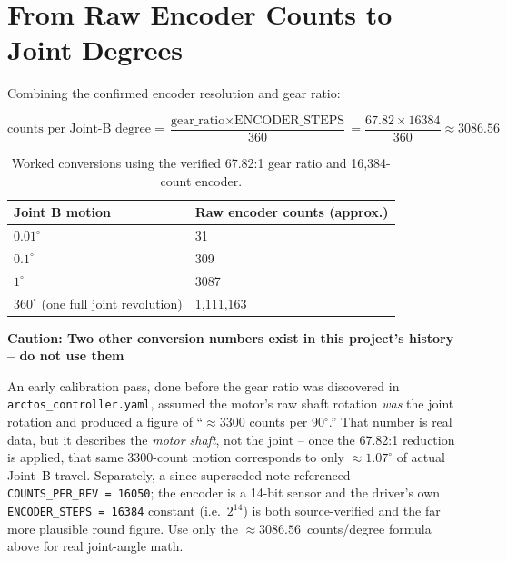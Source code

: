 \documentclass[11pt,letterpaper]{article}
\newenvironment{caution}[1]{%
    \par\addvspace{8pt}%
    \noindent{\color{cautionred}\rule{\linewidth}{0.8pt}}\par\vspace{2pt}
    \noindent\textbf{\color{cautionred}Caution: #1}\par\vspace{2pt}
}{%
    \par\vspace{2pt}\noindent{\color{cautionred}\rule{\linewidth}{0.4pt}}%
    \par\addvspace{8pt}%
}
\begin{document}
\newpage
\section{From Raw Encoder Counts to Joint Degrees}

Combining the confirmed encoder resolution and gear ratio:

\[
\text{counts per Joint-B degree} = \frac{\text{gear\_ratio} \times \text{ENCODER\_STEPS}}{360} = \frac{67.82 \times 16384}{360} \approx 3086.56
\]

\begin{table}[h]
\centering
\begin{tabular}{ll}
\toprule
\textbf{Joint B motion} & \textbf{Raw encoder counts (approx.)} \\ \midrule
$0.01^\circ$ & 31 \\
$0.1^\circ$ & 309 \\
$1^\circ$ & 3087 \\
$360^\circ$ (one full joint revolution) & 1{,}111{,}163 \\ \bottomrule
\end{tabular}
\caption{Worked conversions using the verified 67.82:1 gear ratio and 16{,}384-count encoder.}
\end{table}

\begin{caution}{Two other conversion numbers exist in this project's history -- do not use them}
An early calibration pass, done before the gear ratio was discovered in \texttt{arctos\_controller.yaml}, assumed the motor's raw shaft rotation \emph{was} the joint rotation and produced a figure of ``$\approx$3300 counts per 90$^\circ$.'' That number is real data, but it describes the \emph{motor shaft}, not the joint -- once the 67.82:1 reduction is applied, that same 3300-count motion corresponds to only $\approx 1.07^\circ$ of actual Joint~B travel. Separately, a since-superseded note referenced \texttt{COUNTS\_PER\_REV~=~16050}; the encoder is a 14-bit sensor and the driver's own \texttt{ENCODER\_STEPS~=~16384} constant (i.e.\ $2^{14}$) is both source-verified and the far more plausible round figure. Use only the $\approx 3086.56$~counts/degree formula above for real joint-angle math.
\end{caution}
\end{document}
